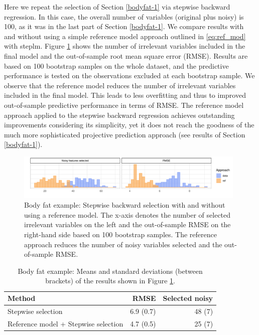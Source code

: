 \documentclass[a4]{article}
\theoremstyle{definition}
\begin{document}
Here we repeat the selection of Section \ref{bodyfat-1} via
stepwise backward regression. In this case, the overall number of
variables (original plus noisy) is 100, as it was in the last part of
Section \ref{bodyfat-1}. We compare results with and without using
a simple reference model approach outlined in \eqref{eq:ref_mod} with
steplm. Figure \ref{fig:bodyfat_step_refvsdata} shows the number of
irrelevant variables included in the final model and the out-of-sample
root mean square error (RMSE). Results are based on 100 bootstrap
samples on the whole dataset, and the predictive performance is tested
on the observations excluded at each bootstrap sample. We observe that
the reference model reduces the number of irrelevant variables included
in the final model. This leads to less overfitting and thus to
improved out-of-sample predictive performance in terms of RMSE. The
reference model approach applied to the stepwise backward regression
achieves outstanding improvements considering its simplicity, yet it
does not reach the goodness of the much more sophisticated projective
prediction approach (see results of Section \ref{bodyfat-1}).
\begin{figure}[tp]
  \centering
  \includegraphics[width=0.98\textwidth]{graphics/bodyfat_step_refvsdata.pdf}
  \vspace{-0.7\baselineskip}
  \caption{Body fat example: Stepwise backward selection with and without using a reference model. The x-axis denotes the number of selected irrelevant variables on the left and the out-of-sample RMSE on the right-hand side based on 100 bootstrap samples. The reference approach reduces the number of noisy variables selected and the out-of-sample RMSE.}
  \label{fig:bodyfat_step_refvsdata}
\end{figure}
\begin{table}[tp]
\footnotesize
\centering
\begin{tabular}{l|rr}
Method & RMSE & Selected noisy \\ 
  \hline
Stepwise selection & 6.9 (0.7) & 48 (7)    \\
Reference model + Stepwise selection & 4.7 (0.5) & 25 (7)   \\
\end{tabular}
\caption{Body fat example: Means and standard deviations (between brackets) of the results shown in Figure \ref{fig:bodyfat_step_refvsdata}.}
\label{tab:step_refvsdata}
\end{table}
\end{document}
